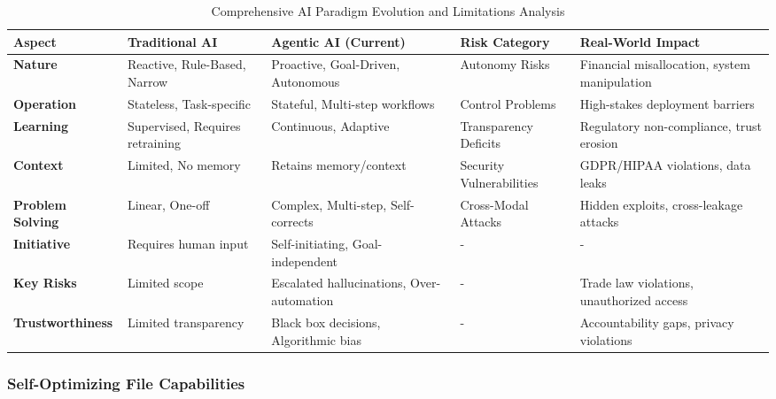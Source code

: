 \documentclass[conference]{IEEEtran}
\begin{document}
\begin{table*}[!t]
\renewcommand{\arraystretch}{1.3}
\caption{Comprehensive AI Paradigm Evolution and Limitations Analysis}
\label{tab:ai-paradigm-analysis}
\centering
\footnotesize
\begin{tabular}{p{2.5cm}p{3.5cm}p{3.5cm}p{3cm}p{3.5cm}}
\toprule
\textbf{Aspect} & \textbf{Traditional AI} & \textbf{Agentic AI (Current)} & \textbf{Risk Category} & \textbf{Real-World Impact} \\
\midrule
\textbf{Nature} & Reactive, Rule-Based, Narrow & Proactive, Goal-Driven, Autonomous & Autonomy Risks & Financial misallocation, system manipulation \\
\textbf{Operation} & Stateless, Task-specific & Stateful, Multi-step workflows & Control Problems & High-stakes deployment barriers \\
\textbf{Learning} & Supervised, Requires retraining & Continuous, Adaptive & Transparency Deficits & Regulatory non-compliance, trust erosion \\
\textbf{Context} & Limited, No memory & Retains memory/context & Security Vulnerabilities & GDPR/HIPAA violations, data leaks \\
\textbf{Problem Solving} & Linear, One-off & Complex, Multi-step, Self-corrects & Cross-Modal Attacks & Hidden exploits, cross-leakage attacks \\
\textbf{Initiative} & Requires human input & Self-initiating, Goal-independent & - & - \\
\textbf{Key Risks} & Limited scope & Escalated hallucinations, Over-automation & - & Trade law violations, unauthorized access \\
\textbf{Trustworthiness} & Limited transparency & Black box decisions, Algorithmic bias & - & Accountability gaps, privacy violations \\
\bottomrule
\end{tabular}
\end{table*}

\subsubsection{Self-Optimizing File Capabilities}
\end{document}
